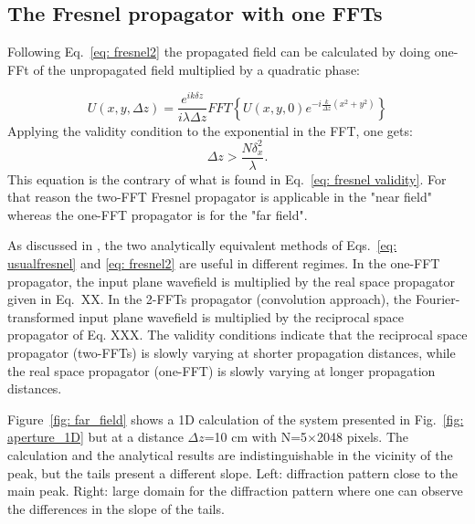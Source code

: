 \documentclass{iucr}              %
\begin{document}
\subsection{The Fresnel propagator with one FFTs}

Following Eq.~\ref{eq: fresnel2} the propagated field can be calculated by doing one-FFt of the unpropagated field multiplied by a quadratic phase: 

\begin{equation}
    U(x,y,\Delta z) = \frac{e^{i k \delta z}}{i \lambda \Delta z} FFT\left\{ U(x,y,0) e^{-i\frac{k}{\Delta z}(x^2+y^2)}\right\}
\end{equation}
Applying the validity condition to the exponential in the FFT, one gets: 
\begin{equation}\label{fig: fresnel2 validity}
    \Delta z > \frac{N \delta_x^2}{\lambda}.
\end{equation}
This equation is the contrary of what is found in Eq.~\ref{eq: fresnel validity}. For that reason the two-FFT Fresnel propagator is applicable in the "near field" whereas the one-FFT propagator is for the "far field". 

As discussed in \cite{Li}, the two analytically equivalent methods of Eqs.~\ref{eq: usualfresnel} and
\ref{eq: fresnel2} are useful in different regimes. In the one-FFT propagator, the input plane wavefield is multiplied by the real space propagator given in Eq.~XX. In the 2-FFTs propagator (convolution approach), the Fourier-transformed input plane wavefield is multiplied
by the reciprocal space propagator of Eq. XXX. The validity conditions indicate that the reciprocal space
propagator (two-FFTs) is slowly varying at shorter propagation distances, while the real space propagator (one-FFT) is slowly varying at longer propagation distances.

Figure~\ref{fig: far_field} shows a 1D calculation of the system presented in Fig.~\ref{fig: aperture_1D} but at a distance $\Delta z$=10 cm with N=5$\times$2048 pixels. The calculation and the analytical results are indistinguishable in the vicinity of the peak, but the tails present a different slope. Left: diffraction pattern close to the main peak. Right: large domain for the diffraction pattern where one can observe the differences in the slope of the tails.
\end{document}
